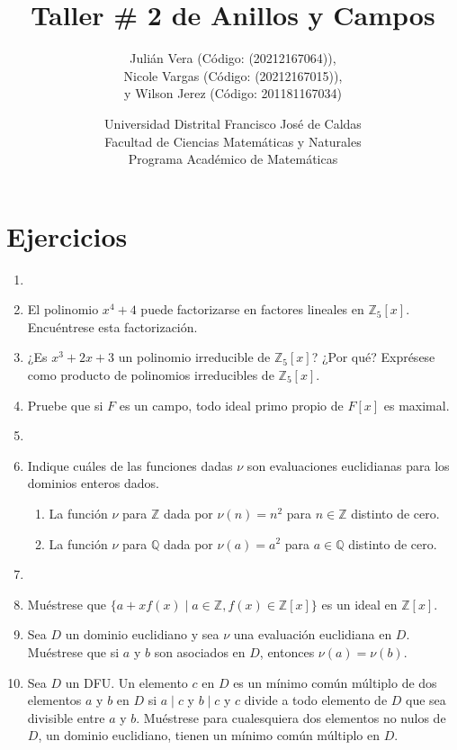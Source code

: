 \documentclass[12pt]{article}
\title{Taller \# 2 de Anillos y Campos}
\author{
    Julián Vera (Código: (20212167064)), \\
    Nicole Vargas (Código: (20212167015)), \\
    y Wilson Jerez (Código: 201181167034)
}
\date{
    Universidad Distrital Francisco José de Caldas \\
    Facultad de Ciencias Matemáticas y Naturales \\
    Programa Académico de Matemáticas
}
\theoremstyle{definition}
\theoremstyle{remark}
\begin{document}
\maketitle

\section*{Ejercicios}

\begin{enumerate}
    \item 
    
    \item El polinomio $x^4 + 4$ puede factorizarse en factores lineales en $\mathbb{Z}_5[x]$. Encuéntrese esta factorización.
    
    \item ¿Es $x^3 + 2x + 3$ un polinomio irreducible de $\mathbb{Z}_5[x]$? ¿Por qué? Exprésese como producto de polinomios irreducibles de $\mathbb{Z}_5[x]$.
    
    \item Pruebe que si $F$ es un campo, todo ideal primo propio de $F[x]$ es maximal.
    
    \item 
    
    \item Indique cuáles de las funciones dadas $\nu$ son evaluaciones euclidianas para los dominios enteros dados.
    \begin{enumerate}
        \item La función $\nu$ para $\mathbb{Z}$ dada por $\nu(n) = n^2$ para $n \in \mathbb{Z}$ distinto de cero.
        \item La función $\nu$ para $\mathbb{Q}$ dada por $\nu(a) = a^2$ para $a \in \mathbb{Q}$ distinto de cero.
    \end{enumerate}
    
    \item 
    
    \item Muéstrese que $\{a+ xf(x) \mid a \in \mathbb{Z}, f(x) \in \mathbb{Z}[x]\}$ es un ideal en $\mathbb{Z}[x]$.
    
    \item Sea $D$ un dominio euclidiano y sea $\nu$ una evaluación euclidiana en $D$. Muéstrese que si $a$ y $b$ son asociados en $D$, entonces $\nu(a) = \nu(b)$.
    
    \item Sea $D$ un DFU. Un elemento $c$ en $D$ es un mínimo común múltiplo de dos elementos $a$ y $b$ en $D$ si $a \mid c$ y $b \mid c$ y $c$ divide a todo elemento de $D$ que sea divisible entre $a$ y $b$. Muéstrese para cualesquiera dos elementos no nulos de $D$, un dominio euclidiano, tienen un mínimo común múltiplo en $D$.
    

\end{enumerate}
\end{document}

